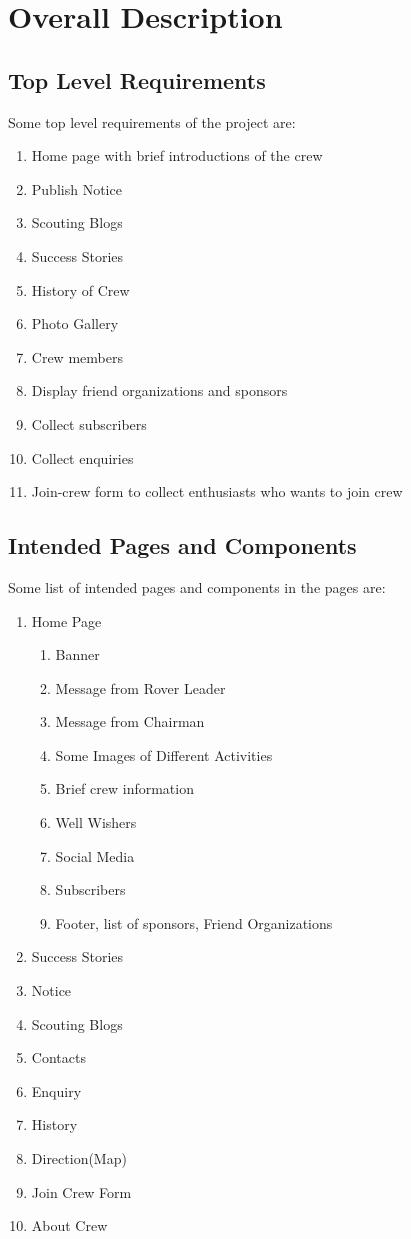 \chapter{Overall Description}
	\section{Top Level Requirements}
		Some top level requirements of the project are:
		\begin{enumerate}
			\item Home page with brief introductions of the crew
			\item Publish Notice
			\item Scouting Blogs
			\item Success Stories
			\item History of Crew
			\item Photo Gallery 
			\item Crew members
			\item Display friend organizations and sponsors
			\item Collect subscribers
			\item Collect enquiries
			\item Join-crew form to collect enthusiasts who wants to join crew 
		\end{enumerate}
	\section{Intended Pages and Components}
		Some list of intended pages and components in the pages are:
		\begin{enumerate}
			\item Home Page
			\begin{enumerate}
				\item Banner
				\item Message from Rover Leader
				\item Message from Chairman
				\item Some Images of Different Activities
				\item Brief crew information
				\item Well Wishers
				\item Social Media
				\item Subscribers
				\item Footer, list of sponsors, Friend Organizations
			\end{enumerate}
			\item Success Stories
			\item Notice
			\item Scouting Blogs
			\item Contacts
			\item Enquiry
			\item History
			\item Direction(Map)
			\item Join Crew Form
			\item About Crew
		\end{enumerate}